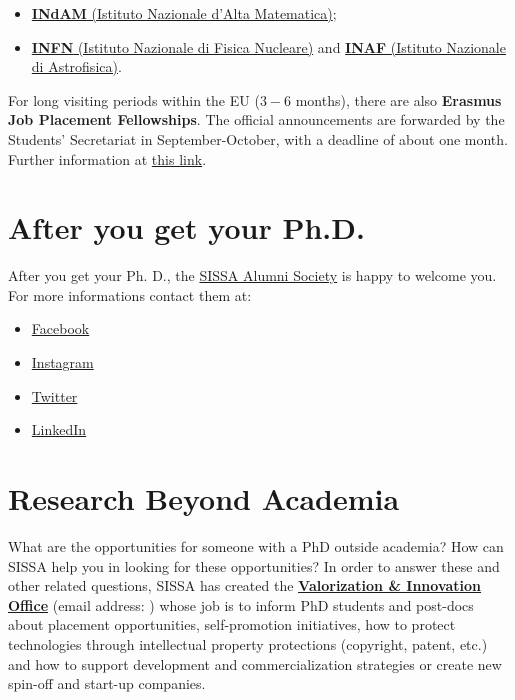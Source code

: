 \documentclass{sissavademecum}
\begin{document}
\begin{itemize}
    \item \href{http://www.altamatematica.it}{ \textbf{INdAM} (Istituto Nazionale d'Alta Matematica)};
    \item \href{http://home.infn.it/en/}{\textbf{INFN} (Istituto Nazionale di Fisica Nucleare)} and \href{http://www.inaf.it/en?set_language=en}{\textbf{INAF} (Istituto Nazionale di Astrofisica)}.
\end{itemize}

For long visiting periods within the EU ($3-6$ months), there are also \textbf{Erasmus Job Placement Fellowships}. The official announcements are forwarded by the Students' Secretariat in September-October, with a deadline of about one month. Further information at \href{http://wiki.sissa.it/students/index.php/Erasmus_\%2B_Programme}{this link}.


\section{After you get your Ph.D.}

After you get your Ph. D., the \href{https://alumni.sissa.it}{SISSA Alumni Society} is happy to welcome you. For more informations contact them at:
\begin{itemize}
    \item \href{https://www.facebook.com/SISSAAlumniSociety/}{Facebook}
    \item \href{https://www.instagram.com/sissaalumni/}{Instagram}
    \item \href{https://twitter.com/AlumniSissa}{Twitter}
    \item \href{https://www.linkedin.com/groups/1761097/}{LinkedIn}
\end{itemize}


\section{Research Beyond Academia}

What are the opportunities for someone with a PhD outside academia? How can SISSA help you in looking for these opportunities? In order to answer these and other related questions, SISSA has created the \href{https://www.sissa.it/technology-transfer/}{\textbf{Valorization \& Innovation Office}} (email address: ) whose job is to inform PhD students and post-docs about placement opportunities, self-promotion initiatives, how to protect technologies through intellectual property protections (copyright, patent, etc.) and how to support development and commercialization strategies or create new spin-off and start-up companies.
\end{document}
